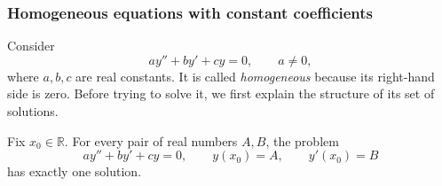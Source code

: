 \subsubsection{Homogeneous equations with constant coefficients}

Consider
\[
    ay''+by'+cy=0,
    \qquad a\neq0,
\]
where \(a,b,c\) are real constants.  It is called \emph{homogeneous}
because its right-hand side is zero.  Before trying to solve it, we first
explain the structure of its set of solutions.

\begin{theorem}
    Fix \(x_0\in\mathbb{R}\).  For every pair of real numbers \(A,B\), the
    problem
    \[
        ay''+by'+cy=0,
        \qquad
        y(x_0)=A,
        \qquad
        y'(x_0)=B
    \]
    has exactly one solution.
\end{theorem}
